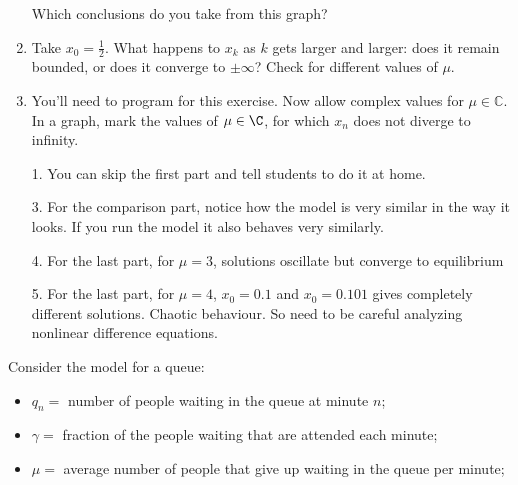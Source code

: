 \begin{exercises}
\begin{problist}
\begin{enumerate}
			Which conclusions do you take from this graph?
			
		\item Take $x_0=\frac12$. What happens to $x_k$ as $k$ gets larger and larger: does it remain bounded, or does it converge to $\pm \infty$? Check for different values of $\mu$.

		\item You'll need to program for this exercise. Now allow complex values for $\mu \in \mathbb{C}$. In a graph, mark the values of $\mu \in \C$, for which $x_n$ does not diverge to infinity.
		
		
	\end{enumerate}

\begin{annotation}
\begin{goals}
	\begin{itemize}
	\item[1.] You can skip the first part and tell students to do it at home.
	
	\item[3.] For the comparison part, notice how the model is very similar in the way it looks. If you run the model it also behaves very similarly.

	
	\item[4.] For the last part, for $\mu=3$, solutions oscillate but converge to equilibrium
	\item[5.] For the last part, for $\mu=4$, $x_0=0.1$ and $x_0=0.101$ gives completely different solutions. Chaotic behaviour. So need to be careful analyzing nonlinear difference equations.
	
	\end{itemize}
\end{goals}	
\end{annotation}

	

	

	\prob Consider the model for a queue:
	\begin{itemize}
		\item $q_n=$ number of people waiting in the queue at minute $n$;
		\item $\gamma=$ fraction of the people waiting that are attended each minute;
		\item $\mu=$ average number of people that give up waiting in the queue per minute;
	\end{itemize}


\end{problist}
\end{exercises}
